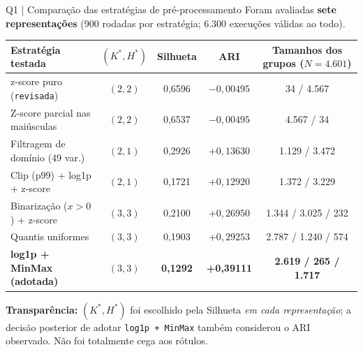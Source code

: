 \documentclass[aspectratio=169,11pt]{beamer}
\begin{document}
\begin{frame}[t]{Q1 | Comparação das estratégias de pré-processamento}
\small Foram avaliadas \textbf{sete representações} (900 rodadas por estratégia; 6.300 execuções válidas ao todo).
\vspace{1.5mm}
\par
\scriptsize
\renewcommand{\arraystretch}{1.08}
\setlength{\tabcolsep}{4.5pt}
\centering
\begin{tabular}{lcccc}
\toprule
\textbf{Estratégia testada} & $(K^*,H^*)$ & \textbf{Silhueta} & \textbf{ARI} & \textbf{Tamanhos dos grupos ($N=4.601$)} \\
\midrule
z-score puro (\texttt{revisada}) & $(2,2)$ & 0,6596 & $-0,00495$ & 34 / 4.567 \\
Z-score parcial nas maiúsculas & $(2,2)$ & 0,6537 & $-0,00495$ & 4.567 / 34 \\
Filtragem de domínio (49 var.) & $(2,1)$ & 0,2926 & $+0,13630$ & 1.129 / 3.472 \\
Clip (p99) + log1p + z-score & $(2,1)$ & 0,1721 & $+0,12920$ & 1.372 / 3.229 \\
Binarização ($x>0$) + z-score & $(3,3)$ & 0,2100 & $+0,26950$ & 1.344 / 3.025 / 232 \\
Quantis uniformes & $(3,3)$ & 0,1903 & $+0,29253$ & 2.787 / 1.240 / 574 \\
\textbf{log1p + MinMax (adotada)} & \textbf{$(3,3)$} & \textbf{0,1292} & \textbf{+0,39111} & \textbf{2.619 / 265 / 1.717} \\
\bottomrule
\end{tabular}
\par
\vspace{1.8mm}
\begin{alertabox}\scriptsize \textbf{Transparência:} $(K^*,H^*)$ foi escolhido pela Silhueta \emph{em cada representação}; a decisão posterior de adotar \texttt{log1p + MinMax} também considerou o ARI observado. Não foi totalmente cega aos rótulos.\end{alertabox}
\end{frame}
\end{document}
